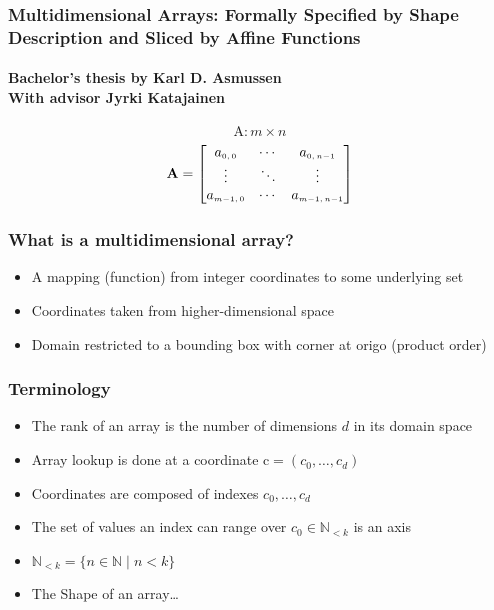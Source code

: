 \documentclass[xetex,mathserif,serif]{beamer}
\newcommand\mrm[1]{\mathrm{#1}}
\newcommand\brm[1]{\bm{\mrm{#1}}}
\newcommand\Nat{\mathbb{N}}
\begin{document}
\begin{frame}
  \frametitle{Multidimensional Arrays: Formally Specified by Shape Description and Sliced by Affine Functions}
  \framesubtitle{Bachelor's thesis by Karl D. Asmussen \\
  With advisor Jyrki Katajainen}
  
  \[
    \bm{\mathrm{A}} : m \times n
  \]
  \[ \bm{\mathrm{A}}=
      \begin{bmatrix}
        a_{\text{\tiny$0,0$}} & \cdots & a_{\text{\tiny$0,n{-}1$}} \\
        \vdots & \ddots & \vdots \\
        a_{\text{\tiny$m{-}1,0$}} & \cdots & a_{\text{\tiny$m{-}1,n{-}1$}}
      \end{bmatrix}
  \]
\end{frame}

\begin{frame}
  \frametitle{What is a multidimensional array?}
  \pause
  \begin{itemize}[<+->]
    \item A mapping (function) from integer coordinates to some underlying set
    \item Coordinates taken from higher-dimensional space
    \item Domain restricted to a bounding box with corner at origo (product order)
  \end{itemize}
\end{frame}

\begin{frame}
  \frametitle{Terminology}
  \pause
  \begin{itemize}[<+->]
    \item The rank of an array is the number of dimensions \(d\) in its domain space
    \item Array lookup is done at a coordinate \(\brm c = (c_0,\dots,c_d)\)
    \item Coordinates are composed of indexes \(c_0,\dots,c_d\)
    \item The set of values an index can range over \(c_0 \in \Nat_{<k}\) is an axis
    \item \(\Nat_{<k} = \{ n \in \Nat \mid n < k \}\)
    \item The Shape of an array\dots
  \end{itemize}
\end{frame}
\end{document}
